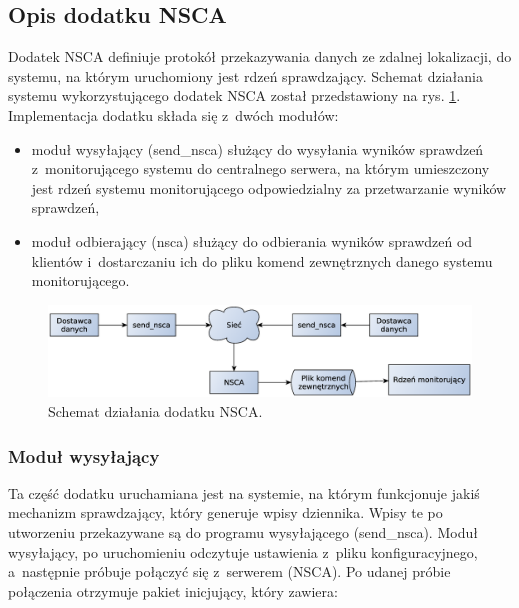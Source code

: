 \subsection[Opis dodatku NSCA][Opis dodatku NSCA]{Opis dodatku NSCA}

Dodatek NSCA definiuje protokół przekazywania danych ze zdalnej
lokalizacji, do systemu, na którym uruchomiony jest rdzeń
sprawdzający. Schemat działania systemu wykorzystującego dodatek NSCA
został przedstawiony na rys. \ref{fig:nsca}. Implementacja dodatku składa
się z~dwóch modułów:

\begin{itemize}
\item moduł wysyłający (send\_nsca) służący do wysyłania wyników
  sprawdzeń z~monitorującego systemu do centralnego serwera, na którym
  umieszczony jest rdzeń systemu monitorującego odpowiedzialny za
  przetwarzanie wyników sprawdzeń,
\item moduł odbierający (nsca) służący do odbierania wyników sprawdzeń
  od klientów i~dostarczaniu ich do pliku komend zewnętrznych danego
  systemu monitorującego.
\end{itemize}

\begin{figure}[ht]
  \caption{Schemat działania dodatku NSCA.}
  \label{fig:nsca}
\includegraphics[width=1\textwidth]{img/nsca}
\end{figure}


\subsubsection[Moduł wysyłający][Moduł wysyłający]{Moduł wysyłający}
\label{subsubsec:modulWysylajacy}

Ta część dodatku uruchamiana jest na systemie, na którym funkcjonuje
jakiś mechanizm sprawdzający, który generuje wpisy dziennika. Wpisy te
po utworzeniu przekazywane są do programu wysyłającego (send\_nsca). Moduł
wysyłający, po uruchomieniu odczytuje ustawienia z~pliku
konfiguracyjnego, a~następnie próbuje połączyć się z~serwerem (NSCA). Po
udanej próbie połączenia otrzymuje pakiet inicjujący, który zawiera:

